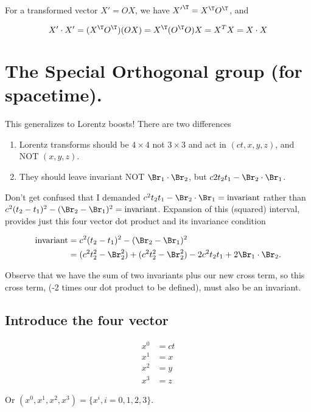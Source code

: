For a transformed vector $X' = O X$, we have ${X'}^\T = X^\T O^\T$, and

\begin{equation}\label{eqn:relativisticElectrodynamicsL6:16}
X' \cdot X' = (X^\T O^\T) (O X) = X^\T (O^\T O) X = X^T X = X \cdot X
\end{equation}

\section{The Special Orthogonal group (for spacetime).}

This generalizes to Lorentz boosts!  There are two differences

\begin{enumerate}
\item Lorentz transforms should be $4 \times 4$ not $3 \times 3$ and act in $(ct, x, y, z)$, and NOT $(x,y,z)$.
\item They should leave invariant NOT $\Br_1 \cdot \Br_2$, but $c2 t_2 t_1 - \Br_2 \cdot \Br_1$.
\end{enumerate}

Don't get confused that I demanded $c^2 t_2 t_1 - \Br_2 \cdot \Br_1 = \text{invariant}$ rather than $c^2 (t_2 - t_1)^2 - (\Br_2 - \Br_1)^2 = \text{invariant}$.  Expansion of this (squared) interval, provides just this four vector dot product and its invariance condition

\begin{align*}
\text{invariant} 
&=
c^2 (t_2 - t_1)^2 - (\Br_2 - \Br_1)^2 \\
&=
(c^2 t_2^2 - \Br_2^2) + (c^2 t_2^2 - \Br_2^2)
- 2 c^2 t_2 t_1 + 2 \Br_1 \cdot \Br_2.
\end{align*}

Observe that we have the sum of two invariants plus our new cross term, so this cross term, (-2 times our dot product to be defined), must also be an invariant.

\subsection{Introduce the four vector}

\begin{align*}
x^0 &= ct \\
x^1 &= x \\
x^2 &= y \\
x^3 &= z 
\end{align*}

Or $(x^0, x^1, x^2, x^3) = \{ x^i, i = 0,1,2,3 \}$.

